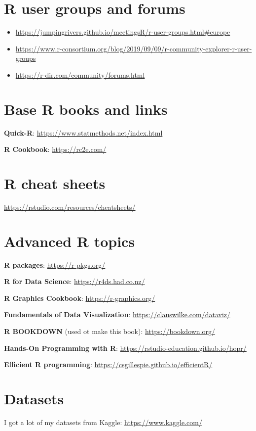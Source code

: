 \documentclass[]{book}
\providecommand{\tightlist}{%
  \setlength{\itemsep}{0pt}\setlength{\parskip}{0pt}}
\begin{document}
\section{R user groups and forums}\label{r-user-groups-and-forums}

\begin{itemize}
\tightlist
\item
  \url{https://jumpingrivers.github.io/meetingsR/r-user-groups.html\#europe}
\item
  \url{https://www.r-consortium.org/blog/2019/09/09/r-community-explorer-r-user-groups}
\item
  \url{https://r-dir.com/community/forums.html}
\end{itemize}

\section{Base R books and links}\label{base-r-books-and-links}

\textbf{Quick-R}: \url{https://www.statmethods.net/index.html}

\textbf{R Cookbook}: \url{https://rc2e.com/}

\section{R cheat sheets}\label{r-cheat-sheets}

\url{https://rstudio.com/resources/cheatsheets/}

\section{Advanced R topics}\label{advanced-r-topics}

\textbf{R packages}: \url{https://r-pkgs.org/}

\textbf{R for Data Science}: \url{https://r4ds.had.co.nz/}

\textbf{R Graphics Cookbook}: \url{https://r-graphics.org/}

\textbf{Fundamentals of Data Visualization}:
\url{https://clauswilke.com/dataviz/}

\textbf{R BOOKDOWN} (used ot make this book):
\url{https://bookdown.org/}

\textbf{Hands-On Programming with R}:
\url{https://rstudio-education.github.io/hopr/}

\textbf{Efficient R programming}:
\url{https://csgillespie.github.io/efficientR/}

\section{Datasets}\label{datasets}

I got a lot of my datasets from Kaggle: \url{https://www.kaggle.com/}


\end{document}
